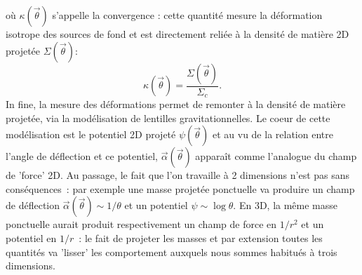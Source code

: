 où $\kappa (\vec{\theta})$ s'appelle la convergence : cette quantité mesure la déformation isotrope des sources de fond et est directement reliée à la densité de matière 2D projetée $\Sigma(\vec{\theta})$:
\begin{equation}
\kappa (\vec{\theta}) =\frac{\Sigma(\vec{\theta})}{\Sigma_c}.
\end{equation}
In fine, la mesure des déformations permet de remonter à la densité de matière projetée, via la modélisation de lentilles gravitationnelles. Le coeur de cette modélisation est le potentiel 2D projeté $\psi(\vec{\theta})$ et au vu de la relation entre l'angle de déflection et ce potentiel, $\vec{\alpha}(\vec{\theta})$ apparaît comme l'analogue du champ de 'force' 2D. Au passage, le fait que l'on travaille à 2 dimensions n'est pas sans conséquences~: par exemple une masse projetée ponctuelle va produire un champ de déflection $\vec{\alpha}(\vec{\theta})\sim 1/\theta$ et un potentiel $\psi \sim \log \theta$. En 3D, la même masse ponctuelle aurait produit respectivement un champ de force en $1/r^2$ et un potentiel en $1/r$~: le fait de projeter les masses et par extension toutes les quantités va 'lisser' les comportement auxquels nous sommes habitués à trois dimensions.
